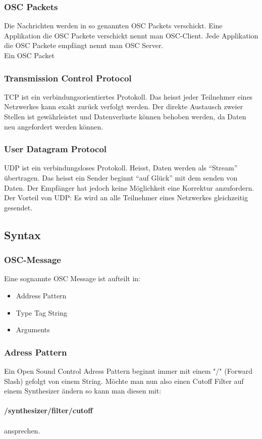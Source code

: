 \documentclass[a4paper, 12pt]{article}
\begin{document}
\subsubsection{OSC Packets}
Die Nachrichten werden in so genannten OSC Packets verschickt. Eine Applikation die OSC Packete verschickt nennt man OSC-Client. Jede Applikation die OSC Packete empfängt nennt man OSC Server.
\\
Ein OSC Packet
\subsubsection{Transmission Control Protocol}
TCP ist ein verbindungsorientiertes Protokoll. Das heisst jeder Teilnehmer eines Netzwerkes kann exakt zurück verfolgt werden. Der direkte Austausch zweier Stellen ist gewährleistet und Datenverluste können behoben werden, da Daten neu angefordert werden können.

\subsubsection{User Datagram Protocol}
UDP ist ein verbindungsloses Protokoll. Heisst, Daten werden als “Stream” übertragen. Das heisst ein Sender beginnt “auf Glück” mit dem senden von Daten. Der Empfänger hat jedoch keine Möglichkeit eine Korrektur anzufordern. Der Vorteil von UDP: Es wird an alle Teilnehmer eines Netzwerkes gleichzeitig gesendet.
\subsection{Syntax}
\subsubsection{OSC-Message}
Eine sognannte OSC Message ist aufteilt in:
\begin{itemize}
  \item Address Pattern
  \item Type Tag String
  \item Arguments
\end{itemize}
\subsubsection{Adress Pattern}
Ein Open Sound Control Adress Pattern beginnt immer mit einem "/" (Forward Slash) gefolgt von einem String. Möchte man nun also einen Cutoff Filter auf einem Synthesizer ändern so kann man diesen mit:\\
\\
{\bf /synthesizer/filter/cutoff } \\
\\
ansprechen.
\end{document}
